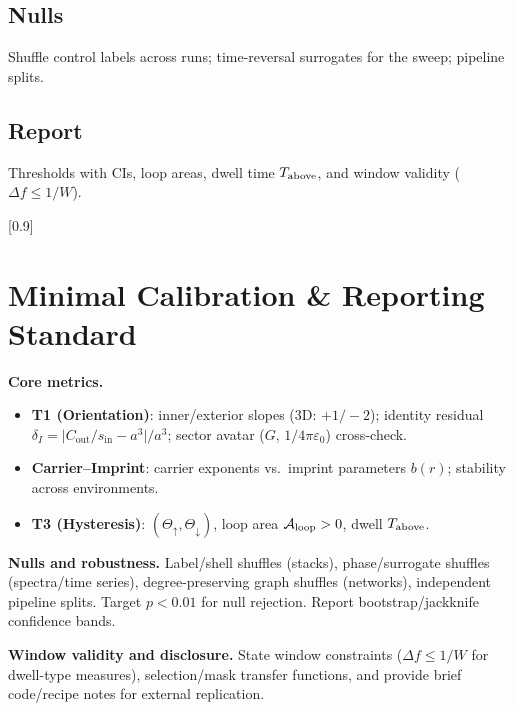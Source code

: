 \documentclass[12pt,a4paper,oneside]{scrreprt}
\newcommand{\sinIn}{s_{\mathrm{in}}}
\newcommand{\Cout}{C_{\mathrm{out}}}
\begin{document}
\section*{Nulls}
Shuffle control labels across runs; time-reversal surrogates for the sweep; pipeline splits.

\section*{Report}
Thresholds with CIs, loop areas, dwell time $T_{\rm above}$, and window validity ($\Delta f\le 1/W$).

[0.9]

\chapter*{Minimal Calibration \& Reporting Standard}
\noindent\textbf{Core metrics.}
\begin{itemize}\setlength\itemsep{0.2em}
\item \textbf{T1 (Orientation)}: inner/exterior slopes (3D: $+1/-2$); identity residual $\delta_I=\big|\Cout/\sinIn-a^3\big|/a^3$; sector avatar ($G$, $1/4\pi\varepsilon_0$) cross-check.
\item \textbf{Carrier–Imprint}: carrier exponents vs.\ imprint parameters $b(r)$; stability across environments.
\item \textbf{T3 (Hysteresis)}: $(\Theta_\uparrow,\Theta_\downarrow)$, loop area $\mathcal A_{\rm loop}>0$, dwell $T_{\rm above}$.
\end{itemize}

\noindent\textbf{Nulls and robustness.}
Label/shell shuffles (stacks), phase/surrogate shuffles (spectra/time series), degree-preserving graph shuffles (networks), independent pipeline splits. Target $p<0.01$ for null rejection. Report bootstrap/jackknife confidence bands.

\noindent\textbf{Window validity and disclosure.}
State window constraints ($\Delta f\le1/W$ for dwell-type measures), selection/mask transfer functions, and provide brief code/recipe notes for external replication.
\end{document}
